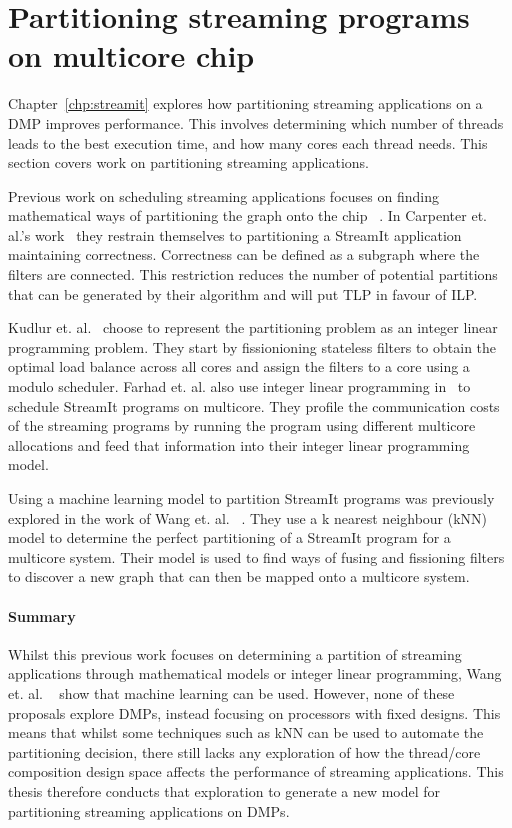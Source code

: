 \section{Partitioning streaming programs on multicore chip}
Chapter~\ref{chp:streamit} explores how partitioning streaming applications on a DMP improves performance.
This involves determining which number of threads leads to the best execution time, and how many cores each thread needs.
This section covers work on partitioning streaming applications. 

Previous work on scheduling streaming applications focuses on finding mathematical ways of partitioning the graph onto the chip ~\cite{carpenter2009streammap,kudlur2008orchestratingstreamprog}.  
In Carpenter et. al.'s work~\cite{carpenter2009streammap} they restrain themselves to partitioning a StreamIt application maintaining correctness.
Correctness can be defined as a subgraph where the filters are connected. 
This restriction reduces the number of potential partitions that can be generated by their algorithm and will put TLP in favour of ILP. 

Kudlur et. al.~\cite{kudlur2008orchestratingstreamprog} choose to represent the partitioning problem as an integer linear programming problem.
They start by fissionioning stateless filters to obtain the optimal load balance across all cores and assign the filters to a core using a modulo scheduler.
Farhad et. al. also use integer linear programming in~\cite{farhad2012streamilp} to schedule StreamIt programs on multicore.
They profile the communication costs of the streaming programs by running the program using different multicore allocations and feed that information into their integer linear programming model.

Using a machine learning model to partition StreamIt programs was previously explored in the work of Wang et. al. ~\cite{wang2013partitionstreamit}.
They use a k nearest neighbour (kNN) model to determine the perfect partitioning of a StreamIt program for a multicore system. 
Their model is used to find ways of fusing and fissioning filters to discover a new graph that can then be mapped onto a multicore system.
\vspace{-1em}
\paragraph*{Summary}
Whilst this previous work focuses on determining a partition of streaming applications through mathematical models or integer linear programming, Wang et. al. ~\cite{wang2013partitionstreamit} show that machine learning can be used.
However, none of these proposals explore DMPs, instead focusing on processors with fixed designs.
This means that whilst some techniques such as kNN can be used to automate the partitioning decision, there still lacks any exploration of how the thread/core composition design space affects the performance of streaming applications.
This thesis therefore conducts that exploration to generate a new model for partitioning streaming applications on DMPs.
 

